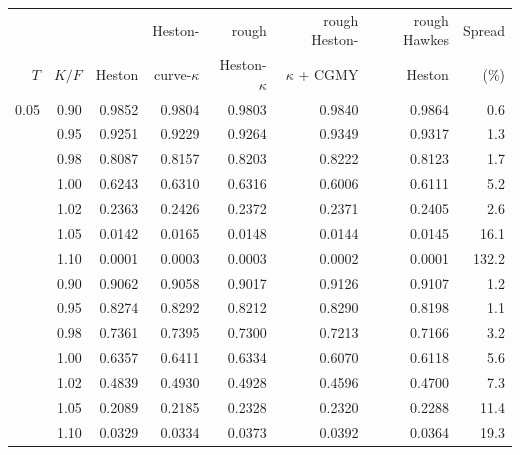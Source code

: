 \begin{tabular}{rrrrrrrr}
\toprule
 &  &  & Heston- & rough & rough Heston- & rough Hawkes & Spread\\
$T$ & $K/F$ & Heston & curve-$\kappa$ & Heston-$\kappa$ & $\kappa$ + CGMY & Heston & (\%)\\
\midrule
0.05 & 0.90 & 0.9852 & 0.9804 & 0.9803 & 0.9840 & 0.9864 & 0.6\\
 & 0.95 & 0.9251 & 0.9229 & 0.9264 & 0.9349 & 0.9317 & 1.3\\
 & 0.98 & 0.8087 & 0.8157 & 0.8203 & 0.8222 & 0.8123 & 1.7\\
 & 1.00 & 0.6243 & 0.6310 & 0.6316 & 0.6006 & 0.6111 & 5.2\\
 & 1.02 & 0.2363 & 0.2426 & 0.2372 & 0.2371 & 0.2405 & 2.6\\
 & 1.05 & 0.0142 & 0.0165 & 0.0148 & 0.0144 & 0.0145 & 16.1\\
 & 1.10 & 0.0001 & 0.0003 & 0.0003 & 0.0002 & 0.0001 & 132.2\\
\addlinespace
0.25 & 0.90 & 0.9062 & 0.9058 & 0.9017 & 0.9126 & 0.9107 & 1.2\\
 & 0.95 & 0.8274 & 0.8292 & 0.8212 & 0.8290 & 0.8198 & 1.1\\
 & 0.98 & 0.7361 & 0.7395 & 0.7300 & 0.7213 & 0.7166 & 3.2\\
 & 1.00 & 0.6357 & 0.6411 & 0.6334 & 0.6070 & 0.6118 & 5.6\\
 & 1.02 & 0.4839 & 0.4930 & 0.4928 & 0.4596 & 0.4700 & 7.3\\
 & 1.05 & 0.2089 & 0.2185 & 0.2328 & 0.2320 & 0.2288 & 11.4\\
 & 1.10 & 0.0329 & 0.0334 & 0.0373 & 0.0392 & 0.0364 & 19.3\\
\bottomrule
\end{tabular}
